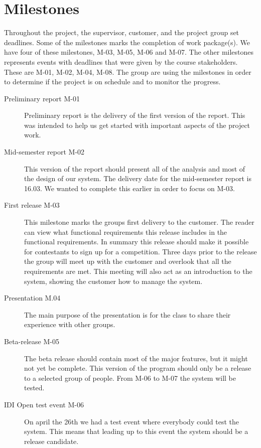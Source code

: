 \section{Milestones}
Throughout the project, the supervisor, customer, and the project group
set deadlines.
Some of the milestones marks the completion of work package(s). We have
four of these milestones, M-03, M-05, M-06 and M-07. The other
milestones represents events with deadlines that were given by the
course stakeholders. These are M-01, M-02, M-04, M-08. The group are
using the milestones in order to determine if the project is on
schedule and to monitor the progress.

\begin{description}
    \item[Preliminary report M-01]
    Preliminary report is the delivery of the first version of the report.
    This was intended to help us get started with important aspects of the
    project work.

    \item[Mid-semester report M-02]
    This version of the report should present all of the analysis and most
    of the design of our system. The delivery date for the mid-semester
    report is 16.03. We wanted to complete this earlier in order to focus
    on M-03.

    \item[First release M-03]
    This milestone marks the groups first delivery to the customer. The
    reader can view what functional requirements this release includes in
    the functional requirements. In summary this release should
    make it possible for contestants to sign up for a competition. Three
    days prior to the release the group will meet up with the customer and
    overlook that all the requirements are met. This meeting will also act
    as an introduction to the system, showing the customer how to manage
    the system. 

    \item[Presentation M.04]
    The main purpose of the presentation is for the class to share their
    experience with other groups. 

    \item[Beta-release M-05]
    The beta release should contain most of the major features, but it might
    not yet be complete. This version of the program should only be a
    release to a selected group of people. From M-06 to M-07 the system
    will be tested.

    \item[IDI Open test event M-06]
    On april the 26th we had a test event where everybody could test the
    system. This means that leading up to this event the system should be a
    release candidate. 


\end{description}
